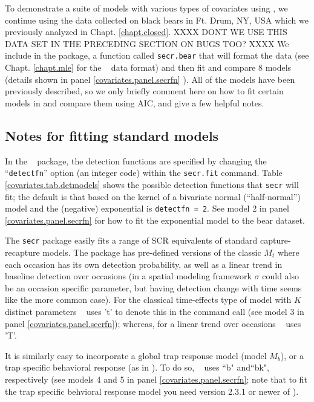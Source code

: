 To demonstrate
a suite of models with various types of covariates using \secr, we
continue using the data collected on black bears in Ft. Drum, NY, USA
which we previously analyzed in Chapt. \ref{chapt.closed}. XXXX DONT WE USE THIS DATA SET IN THE PRECEDING SECTION ON BUGS TOO? XXXX  We include
in the \scrbook package, a function called {\tt secr.bear} that will 
format the data (see Chapt. \ref{chapt.mle} for the \secr~ data format) and then fit and compare 8 models (details shown in panel 
\ref{covariates.panel.secrfn} ).  All of the models have been 
previously described, so we only briefly comment here on how to fit
certain models in \secr and compare them using AIC, and give a few helpful notes.  

\subsection{Notes for fitting standard models}

In the \secr~ package, the detection functions are specified
by changing the ``\mbox{\tt detectfn}'' option (an integer code)
within the \mbox{\tt secr.fit} command.  Table
\ref{covariates.tab.detmodels} shows the possible detection functions
that \mbox{\tt secr} will fit; the default is that based on the kernel
of a bivariate normal
(``half-normal'') model and the
(negative) exponential is \mbox{\tt detectfn = 2}.  See model 2 in 
panel \ref{covariates.panel.secrfn} for how to fit the exponential 
model to the bear dataset. 

The \mbox{\tt secr} package easily fits a range of SCR equivalents of standard capture-recapture models.
The package has pre-defined versions of the classic
$M_{t}$ where each
occasion has its own detection probability, as well as a linear
trend in baseline detection over occasions (in a spatial modeling framework $\sigma$ could also be an occasion specific parameter, but having detection change with time seems like the more common case). For the classical
time-effects type of model with $K$ distinct parameters \secr~ uses 't' to denote
this in the command call (see model 3 in 
panel \ref{covariates.panel.secrfn}); whereas, for a linear
trend over occasions \secr~ uses 'T'.

It is similarly easy to incorporate a global trap response model (model $M_{b}$), 
or a trap specific behavioral response (as in
\citet{royle_etal:2009}). To do so, \secr~ uses ``b" and``bk", respectively 
(see models 4 and 5 in 
panel \ref{covariates.panel.secrfn}; note that to fit the trap specific behvioral response model you need version 2.3.1 or newer of \secr).

